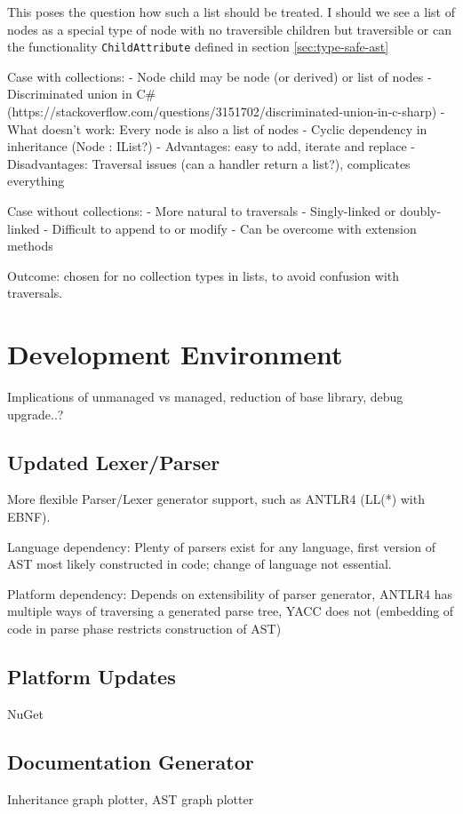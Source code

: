 \documentclass[twoside,openright]{uva-bachelor-thesis}
\newcommand{\code}[1]{\texttt{\footnotesize#1}}
\begin{document}
		This poses the question how such a list should be treated. I should we see a list of nodes as a special type of node with no traversible children but traversible or can the functionality  \code{ChildAttribute} defined in section \ref{sec:type-safe-ast} 
		
		Case with collections:
		- Node child may be node (or derived) or list of nodes
		- Discriminated union in C\# (https://stackoverflow.com/questions/3151702/discriminated-union-in-c-sharp)
		- What doesn't work: Every node is also a list of nodes
		- Cyclic dependency in inheritance (Node : IList?)
		- Advantages: easy to add, iterate and replace
		- Disadvantages: Traversal issues (can a handler return a list?), complicates everything
		
		Case without collections:
		- More natural to traversals
		- Singly-linked or doubly-linked
		- Difficult to append to or modify
		- Can be overcome with extension methods
		
		Outcome: chosen for no collection types in lists, to avoid confusion with traversals.
			
	\section{Development Environment}
		Implications of unmanaged vs managed, reduction of base library, debug upgrade..?
		
		\subsection{Updated Lexer/Parser}
			More flexible Parser/Lexer generator support, such as ANTLR4 (LL(*) with EBNF).
						
			Language dependency: Plenty of parsers exist for any language, first version of AST most likely constructed in code; change of language not essential.
			
			Platform dependency: Depends on extensibility of parser generator, ANTLR4 has multiple ways of traversing a generated parse tree, YACC does not (embedding of code in parse phase restricts construction of AST)
			
		\subsection{Platform Updates}
			NuGet
			
		\subsection{Documentation Generator}
			Inheritance graph plotter, AST graph plotter
	
\end{document}
